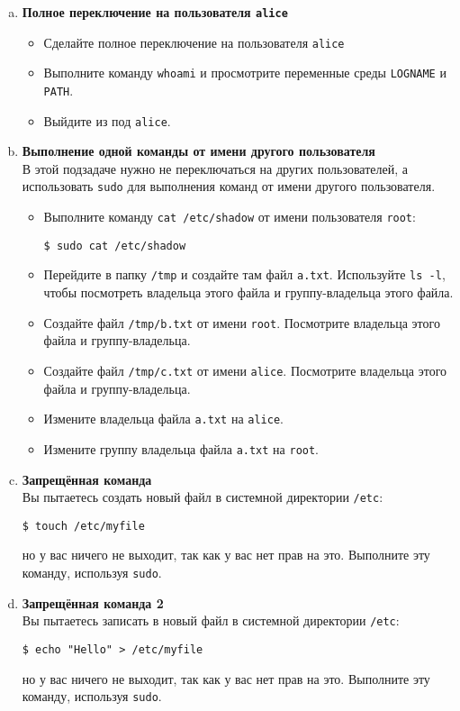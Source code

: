 \documentclass{article}
\begin{document}
\begin{enumerate}[a.]
\item \textbf{Полное переключение на пользователя \texttt{alice}}
\begin{itemize}
\item Сделайте полное переключение на пользователя \texttt{alice}
\item Выполните команду \texttt{whoami} и просмотрите переменные среды \texttt{LOGNAME} и \texttt{PATH}.
\item Выйдите из под \texttt{alice}.
\end{itemize}

\item \textbf{Выполнение одной команды от имени другого пользователя}\\
В этой подзадаче нужно не переключаться на других пользователей, а использовать \texttt{sudo} для выполнения команд от имени другого пользователя.
\begin{itemize}
\item Выполните команду \texttt{cat /etc/shadow} от имени пользователя \texttt{root}:
\begin{lstlisting}
$ sudo cat /etc/shadow
\end{lstlisting}

\item Перейдите в папку \texttt{/tmp} и создайте там файл \texttt{a.txt}. Используйте \texttt{ls -l}, чтобы посмотреть владельца этого файла и группу-владельца этого файла.

\item Создайте файл \texttt{/tmp/b.txt} от имени \texttt{root}. Посмотрите владельца этого файла и группу-владельца.

\item Создайте файл \texttt{/tmp/c.txt} от имени \texttt{alice}. Посмотрите владельца этого файла и группу-владельца.

\item Измените владельца файла \texttt{a.txt} на \texttt{alice}.
\item Измените группу владельца файла \texttt{a.txt} на \texttt{root}.
\end{itemize}

\item \textbf{Запрещённая команда}\\
Вы пытаетесь создать новый файл в системной директории \texttt{/etc}:
\begin{lstlisting}
$ touch /etc/myfile
\end{lstlisting}
но у вас ничего не выходит, так как у вас нет прав на это. Выполните эту команду, используя \texttt{sudo}.

\item \textbf{Запрещённая команда 2}\\
Вы пытаетесь записать в новый файл в системной директории \texttt{/etc}:
\begin{lstlisting}
$ echo "Hello" > /etc/myfile
\end{lstlisting}
но у вас ничего не выходит, так как у вас нет прав на это. Выполните эту команду, используя \texttt{sudo}.


\end{enumerate}
\end{document}
